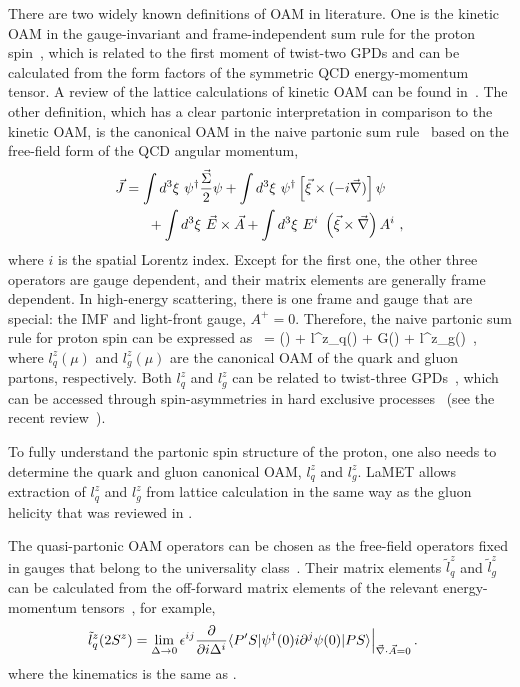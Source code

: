 There are two widely known definitions of OAM in literature. One is the kinetic OAM in the gauge-invariant and frame-independent  sum rule for the proton spin~\cite{Ji:1996ek,Ji:1996nm}, which is related to the first moment of twist-two GPDs and can be calculated from the form factors of the symmetric QCD energy-momentum tensor. A review of the lattice calculations of kinetic OAM can be found in~\cite{Ji:2020ena}. The other definition, which has a clear partonic interpretation in comparison to the kinetic OAM, is the canonical OAM in the naive partonic sum rule~\cite{Jaffe:1989jz} based on the free-field form of the QCD angular momentum,
\begin{align}\label{eq:jmam}
	\vec{J} &= \int d^3\xi\ \psi^\dagger \frac{\vec{\Sigma}}{2} \psi + \int d^3\xi\ \psi^\dagger\left[\vec{\xi}\times (-i\vec{\nabla} )\right]\psi \nn\\
	&\ \ \ \ \ + \int d^3\xi\ \vec{E}\times\vec{A} + \int d^3\xi\ E^i\ \left(\vec{\xi}\times\vec{\nabla}\right) A^{i} \ ,
\end{align}
where $i$ is the spatial Lorentz index. Except for the first one,
the other three operators are gauge dependent, and their matrix elements are
generally frame dependent. In high-energy scattering, there is one frame and
gauge that are special: the IMF and light-front gauge, $A^+=0$.
Therefore, the naive partonic sum rule for proton spin can be expressed as~\cite{Jaffe:1989jz}
\beq\label{eq:jm}
= \Delta \Sigma(\mu)  + l^z_q(\mu) + \Delta G(\mu) + l^z_g(\mu) \,,
\eeq
where $l^z_q(\mu)$ and $l^z_g(\mu)$ are the canonical
OAM of the quark and gluon partons, respectively.
Both $l_q^z$ and $l_g^z$ can be related to twist-three GPDs~\cite{Hatta:2011ku,Ji:2012ba,Hatta:2012cs}, which can be accessed through spin-asymmetries in hard exclusive processes~\cite{Ji:2016jgn,Hatta:2016aoc,Bhattacharya:2017bvs,Bhattacharya:2018lgm} (see the recent review~\cite{Ji:2020ena}).

To fully understand the partonic spin structure of the proton,
one also needs to determine the quark and gluon canonical OAM, $l^z_q$ and $l^z_g$.
LaMET allows extraction of $l_q^z$ and $l_g^z$ from lattice calculation in the same way as the gluon helicity that was reviewed in .

The quasi-partonic OAM operators can be chosen as the free-field operators fixed in gauges that
belong to the universality class~\cite{Hatta:2013gta}.
Their matrix elements $\tilde l^z_q$ and $\tilde l^z_g$ can be calculated from the off-forward matrix elements of the relevant energy-momentum tensors~\cite{Zhao:2015kca}, for example,
\begin{align}
	\tilde l^z_q(2S^z) &= \lim_{\Delta\to0} \epsilon^{ij}{\partial \over \partial i\Delta^i}\langle P'S| \psi^\dagger (0) i\partial^j \psi(0)|PS\rangle \Big|_{\vec{\nabla}\cdot \vec{A}=0}\,.
\end{align}
where the kinematics is the same as .

